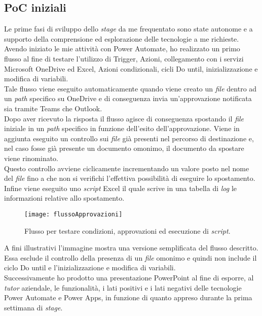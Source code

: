 \subsection{PoC iniziali}
Le prime fasi di sviluppo dello \emph{stage} da me frequentato sono state autonome e a supporto della comprensione ed esplorazione delle tecnologie a me richieste. 
Avendo iniziato le mie attività con Power Automate, ho realizzato un primo flusso al fine di testare l'utilizzo di Trigger, Azioni, collegamento con i servizi Microsoft OneDrive ed Excel, Azioni condizionali, cicli Do until, inizializzazione e modifica di variabili.\\
Tale flusso viene eseguito automaticamente quando viene creato un \emph{file} dentro ad un \emph{path} specifico su OneDrive e di conseguenza invia un'approvazione notificata sia tramite Teams che Outlook.\\
Dopo aver ricevuto la risposta il flusso agisce di conseguenza spostando il \emph{file} iniziale in un \emph{path} specifico in funzione dell'esito dell'approvazione. Viene in aggiunta eseguito un controllo sui \emph{file} già presenti nel percorso di destinazione e, nel caso fosse già presente un documento omonimo, il documento da spostare viene rinominato.\\
Questo controllo avviene ciclicamente incrementando un valore posto nel nome del \emph{file} fino a che non si verifichi l'effettiva possibilità di eseguire lo spostamento.\\
Infine viene eseguito uno \emph{script} Excel il quale scrive in una tabella di \emph{log} le informazioni relative allo spostamento.
\begin{figure}[htbp] 
    \centering 
    \texttt{[image: flussoApprovazioni]} 
    \caption{Flusso per testare condizioni, approvazioni ed esecuzione di \emph{script}.}
    \label{fig:flussoApprovazioni}
\end{figure}
\newline \noindent A fini illustrativi l'immagine mostra una versione semplificata del flusso descritto. Essa esclude il controllo della presenza di un \emph{file} omonimo e quindi non include il ciclo Do until e l'inizializzazione e modifica di variabili.\\
Successivamente ho prodotto una presentazione PowerPoint al fine di esporre, al \emph{tutor} aziendale, le funzionalità, i lati positivi e i lati negativi delle tecnologie Power Automate e Power Apps, in funzione di quanto appreso durante la prima settimana di \emph{stage}.

